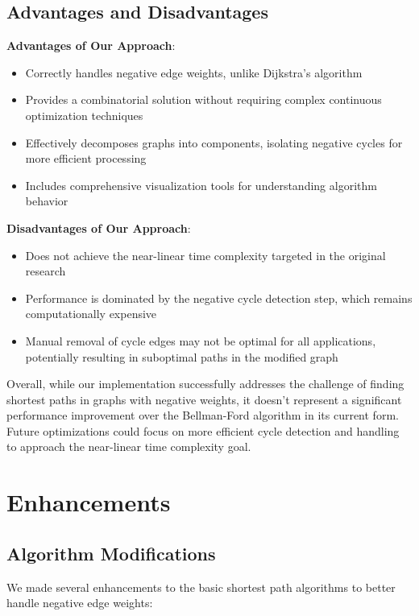 \documentclass[11pt]{article}
\begin{document}
\subsection{Advantages and Disadvantages}

\textbf{Advantages of Our Approach}:
\begin{itemize}
    \item Correctly handles negative edge weights, unlike Dijkstra's algorithm
    \item Provides a combinatorial solution without requiring complex continuous optimization techniques
    \item Effectively decomposes graphs into components, isolating negative cycles for more efficient processing
    \item Includes comprehensive visualization tools for understanding algorithm behavior
\end{itemize}

\textbf{Disadvantages of Our Approach}:
\begin{itemize}
    \item Does not achieve the near-linear time complexity targeted in the original research
    \item Performance is dominated by the negative cycle detection step, which remains computationally expensive
    \item Manual removal of cycle edges may not be optimal for all applications, potentially resulting in suboptimal paths in the modified graph
\end{itemize}

Overall, while our implementation successfully addresses the challenge of finding shortest paths in graphs with negative weights, it doesn't represent a significant performance improvement over the Bellman-Ford algorithm in its current form. Future optimizations could focus on more efficient cycle detection and handling to approach the near-linear time complexity goal.

\section{Enhancements}

\subsection{Algorithm Modifications}

We made several enhancements to the basic shortest path algorithms to better handle negative edge weights:
\end{document}

